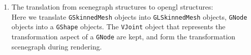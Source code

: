 \begin{enumerate}
\item The translation from scenegraph structures to opengl structures:\\

Here we translate  \verb"GSkinnedMesh" objects into  \verb"GLSkinnedMesh" objects,
\verb"GNode" objects into a \verb"GShape" objects.
The \verb"VJoint" object that represents
the transformation aspect of a \verb"GNode" are kept, and form the transformation scenegraph during rendering.



\end{enumerate}

